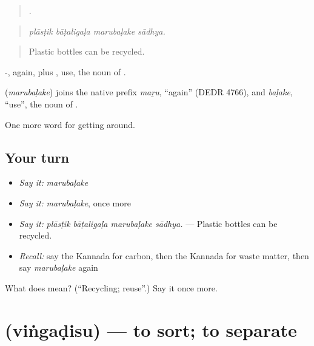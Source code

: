 \begin{quote}
   .
\end{quote}

\begin{quote}
\emph{plāsṭik bāṭaligaḷa marubaḷake sādhya.}
\end{quote}

\begin{quote}
Plastic bottles can be recycled.
\end{quote}

-, again, plus , use, the noun of .

\begin{cousinweb}
\textbf{} (\emph{marubaḷake}) joins the native prefix \emph{maṟu}, \textquotedblleft{}again\textquotedblright{} (DEDR 4766), and \emph{baḷake}, \textquotedblleft{}use\textquotedblright{}, the noun of .
\end{cousinweb}

\begin{grammarlens}[title={What you've built}]
One more word for getting around.
\end{grammarlens}

\subsection*{Your turn}
\begin{itemize}
\raggedright
  \item \emph{Say it:} \emph{marubaḷake}
  \item \emph{Say it:} \emph{marubaḷake}, once more
  \item \emph{Say it:} \emph{plāsṭik bāṭaligaḷa marubaḷake sādhya.} — Plastic bottles can be recycled.
  \item \emph{Recall:} say the Kannada for carbon, then the Kannada for waste matter, then say \emph{marubaḷake} again
\end{itemize}

\begin{tcolorbox}[breakable,colback=teal!4,colframe=teal!35!black,title={Before you move on}]
What does  mean? (\textquotedblleft{}Recycling; reuse\textquotedblright{}.) Say it once more.
\end{tcolorbox}
\section[\texorpdfstring{\kn{ವಿಂಗಡಿಸು} (viṅgaḍisu)}{ವಿಂಗಡಿಸು (viṅgaḍisu)}]{ (viṅgaḍisu) — to sort; to separate}

